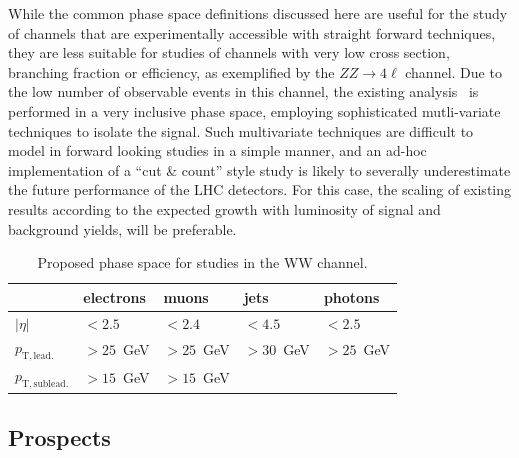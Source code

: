 While the common phase space definitions discussed here are useful for the study of channels that are experimentally accessible with straight forward techniques, they are less suitable for studies of channels with very low cross section, branching fraction or efficiency, as exemplified by the $ZZ\rightarrow 4\ell$ channel. Due to the low number of observable events in this channel, the existing analysis~\cite{CMS-PAS-SMP-17-006} is performed in a very inclusive phase space, employing sophisticated mutli-variate techniques to isolate the signal. Such multivariate techniques are difficult to model in forward looking studies in a simple manner, and an ad-hoc implementation of a  ``cut \& count'' style study is likely to severally underestimate the future performance of the LHC detectors. For this case, the scaling of existing results according to the expected growth with luminosity of signal and background yields, will be preferable.

\begin{table}[htb]
\centering
\begin{tabular}{|l|l|l|l|l|}
    \hline
             & electrons & muons & jets & photons \\
    \hline
    $|\eta|$ & $<2.5$  & $<2.4$ & $<4.5$ & $<2.5$ \\
    $p_\mathrm{T,lead.}$ & $>25$~GeV & $>25$~GeV &$>30$~GeV &$>25$~GeV\\
    $p_\mathrm{T,sublead.}$ & $>15$~GeV & $>15$~GeV &&\\                            
    \hline
  \end{tabular}  

\caption{\label{tab:wg2:phasespace} Proposed phase space for studies in the WW channel.}
\end{table}

\subsection{Prospects}

